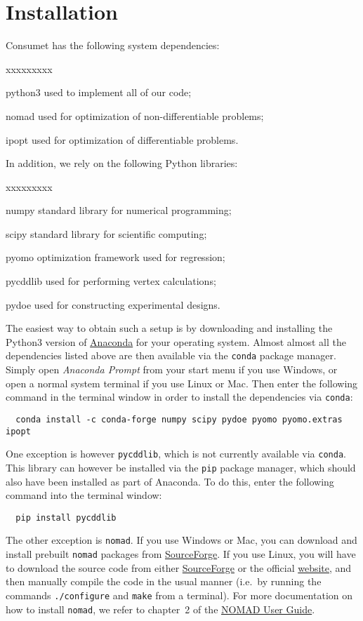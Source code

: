 \documentclass[a4paper,bibliography=numbered]{scrartcl}
\begin{document}
\section{Installation}
Consumet has the following system dependencies:
\begin{labeling}{xxxxxxxxx}
    \item[python3]
        used to implement all of our code;
    \item[nomad]
        used for optimization of non-differentiable problems;
    \item[ipopt]
        used for optimization of differentiable problems.
\end{labeling}
In addition, we rely on the following Python libraries:
\begin{labeling}{xxxxxxxxx}
    \item[numpy]
        standard library for numerical programming;
    \item[scipy]
        standard library for scientific computing;
    \item[pyomo]
        optimization framework used for regression;
    \item[pycddlib]
        used for performing vertex calculations;
    \item[pydoe]
        used for constructing experimental designs.
\end{labeling}
The easiest way to obtain such a setup is by downloading and installing the Python3 version of \href{https://www.anaconda.com/distribution/}{Anaconda} for your operating system.
Almost almost all the dependencies listed above are then available via the \texttt{conda} package manager.
Simply open \emph{Anaconda Prompt} from your start menu if you use Windows, or open a normal system terminal if you use Linux or Mac.
Then enter the following command in the terminal window in order to install the dependencies via \texttt{conda}:
\begin{lstlisting}
  conda install -c conda-forge numpy scipy pydoe pyomo pyomo.extras ipopt
\end{lstlisting}
One exception is however \texttt{pycddlib}, which is not currently available via \texttt{conda}.
This library can however be installed via the \texttt{pip} package manager, which should also have been installed as part of Anaconda.
To do this, enter the following command into the terminal window:
\begin{lstlisting}
  pip install pycddlib
\end{lstlisting}
The other exception is \texttt{nomad}.
If you use Windows or Mac, you can download and install prebuilt \texttt{nomad} packages from \href{https://sourceforge.net/projects/nomad-bb-opt/files/}{SourceForge}.
If you use Linux, you will have to download the source code from either \href{https://sourceforge.net/projects/nomad-bb-opt/files/}{SourceForge} or the official \href{https://www.gerad.ca/nomad/}{website}, and then manually compile the code in the usual manner (i.e.\ by running the commands \texttt{./configure} and \texttt{make} from a terminal).
For more documentation on how to install \texttt{nomad}, we refer to chapter~2 of the \href{https://sourceforge.net/projects/nomad-bb-opt/files/user_guide.pdf/download}{NOMAD User Guide}.
\end{document}
